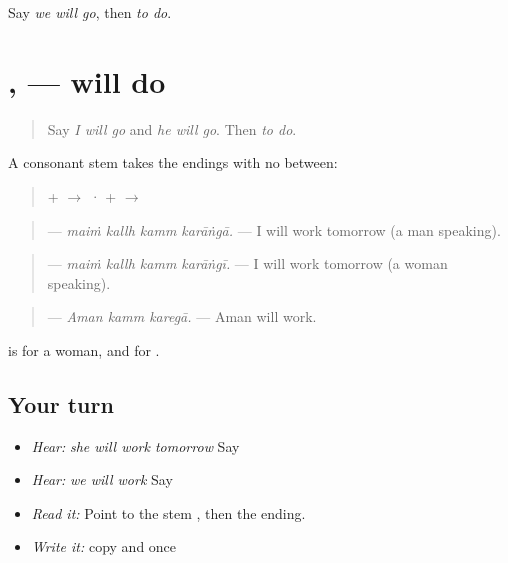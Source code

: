 \begin{tcolorbox}[breakable,colback=teal!4,colframe=teal!35!black,title={Before you move on}]
Say \emph{we will go}, then \emph{to do}.
\end{tcolorbox}
\section[\texorpdfstring{\pa{ਕਰਾਂਗਾ} · \pa{ਕਰੇਗਾ} (karāṅgā · karegā)}{ਕਰਾਂਗਾ · ਕਰੇਗਾ (karāṅgā · karegā)}]{,  — will do}

\label{lesson:PA-C222-karanga}



\begin{quote}
Say \emph{I will go} and \emph{he will go}. Then \emph{to do}.
\end{quote}

\begin{grammarlens}[title={Grammar Lens: the ending straight on}]
A consonant stem takes the endings with no \textbf{} between:

\begin{quote}
\textbf{} + \textbf{} $\to$ \textbf{} · \textbf{} + \textbf{} $\to$ \textbf{}
\end{quote}

\begin{quote}
\textbf{   } — \emph{maiṁ kallh kamm karāṅgā.} — I will work tomorrow (a man speaking).
\end{quote}

\begin{quote}
\textbf{   } — \emph{maiṁ kallh kamm karāṅgī.} — I will work tomorrow (a woman speaking).
\end{quote}

\begin{quote}
\textbf{  } — \emph{Aman kamm karegā.} — Aman will work.
\end{quote}

\textbf{} is for a woman, and \textbf{} for \textbf{}.
\end{grammarlens}

\subsection*{Your turn}
\begin{itemize}
\raggedright
  \item \emph{Hear:} \emph{she will work tomorrow} Say \textbf{   }
  \item \emph{Hear:} \emph{we will work} Say \textbf{  }
  \item \emph{Read it:} \textbf{} Point to the stem \textbf{}, then the ending.
  \item \emph{Write it:} copy \textbf{} and \textbf{} once
\end{itemize}

